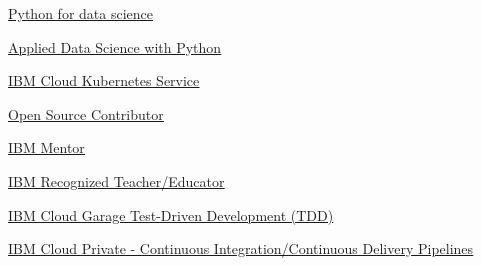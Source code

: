 \begin{coursework}

        {\href{https://courses.edx.org/certificates/0626a02340944e6b9b1854be5e171da0}
        {\underline{Python for data science}}}


        {\href{https://www.youracclaim.com/badges/6f524dff-5ffb-42bd-8e32-f4f3ea50e26c/public_url}
        {\underline{Applied Data Science with Python}}}

        {\href{https://www.youracclaim.com/badges/70a31b3d-c964-4a2d-8f31-ed58a0b00ea7}
        {\underline{IBM Cloud Kubernetes Service}}}



        {\href{https://www.credly.com/badges/bbdcc62b-203f-4e3d-b395-b04c92a26e68}
        {\underline{Open Source Contributor}}}

        {\href{https://www.credly.com/badges/abf05612-bcbe-4746-a697-78417d0cabdb}
        {\underline{IBM Mentor}}}


        {\href{https://www.credly.com/badges/d59b27fb-f4e9-4271-ab4a-172e0b88c091}
        {\underline{IBM Recognized Teacher/Educator}}}

        {\href{https://www.credly.com/badges/9a2fbd8d-8140-430e-b2a6-2befbc0ff81e}
        {\underline{IBM Cloud Garage Test-Driven Development (TDD)}}}

        {\href{https://www.credly.com/badges/16c6ed00-aecc-4e87-b155-27021d8bfbba}
        {\underline{IBM Cloud Private - Continuous Integration/Continuous Delivery Pipelines}}}


\end{coursework}
